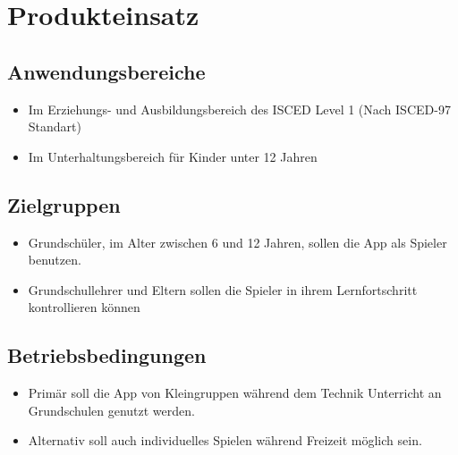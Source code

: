 \section{Produkteinsatz}

\subsection{Anwendungsbereiche}
\begin{itemize}
	\item Im Erziehungs- und Ausbildungsbereich des ISCED Level 1 (Nach ISCED-97 Standart)
	\item Im Unterhaltungsbereich für Kinder unter 12 Jahren
\end{itemize}


\subsection{Zielgruppen}

\begin{itemize}
	\item Grundschüler, im Alter zwischen 6 und 12 Jahren, sollen die App als Spieler benutzen.
	\item Grundschullehrer und Eltern sollen die Spieler in ihrem Lernfortschritt kontrollieren können
\end{itemize}

\subsection{Betriebsbedingungen}
\begin{itemize}
	\item Primär soll die App von Kleingruppen während dem Technik Unterricht an Grundschulen genutzt werden.
	\item Alternativ soll auch individuelles Spielen während Freizeit möglich sein.
\end{itemize}
